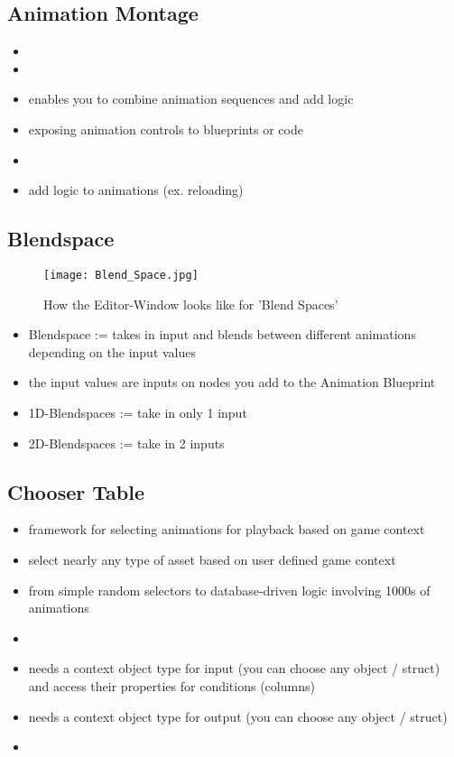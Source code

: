         \subsection{Animation Montage}
            \begin{itemize}
                \item 
                \item 
                \item enables you to combine animation sequences and add logic
                \item exposing animation controls to blueprints or code
                \item 
                \item add logic to animations (ex. reloading)
            \end{itemize}

        \subsection{Blendspace}
        \begin{figure}
            \texttt{[image: Blend\_Space.jpg]}
            \caption{How the Editor-Window looks like for 'Blend Spaces'}
        \end{figure}
        \begin{itemize}
            \item Blendspace := takes in input and blends between different animations depending on the input values
            \item the input values are inputs on nodes you add to the Animation Blueprint
            \item 1D-Blendspaces := take in only 1 input
            \item 2D-Blendspaces := take in 2 inputs
        \end{itemize}


        \subsection{Chooser Table}
            \begin{itemize}
                \item framework for selecting animations for playback based on game context
                \item select nearly any type of asset based on user defined game context
                \item from simple random selectors to database-driven logic involving 1000s of animations
                \item 
                \item needs a context object type for input (you can choose any object / struct) and access their properties for conditions (columns) 
                \item needs a context object type for output (you can choose any object / struct)
                \item 
            \end{itemize}

